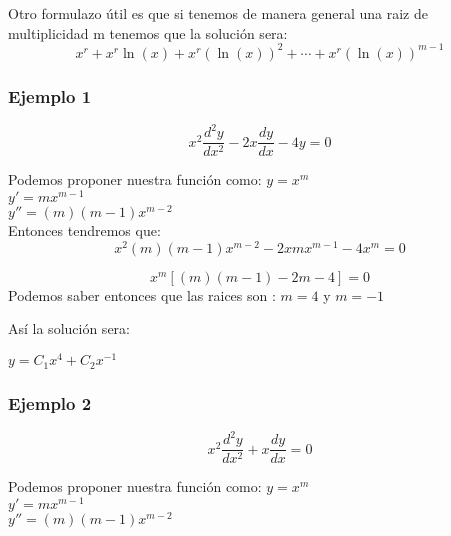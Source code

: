 \documentclass[12pt]{report}                                %
\begin{document}
        Otro formulazo útil es que si tenemos de manera general una raiz de multiplicidad m tenemos que la solución sera:
        \begin{equation}
            x^r + x^r \ln(x) + x^r (\ln(x))^2 + \cdots + x^r (\ln(x))^{m-1}
        \end{equation}


        \clearpage
        \subsubsection{Ejemplo 1}
        \begin{equation*}
            x^2 \frac{d^2 y}{dx^2} - 2x \frac{dy}{dx} - 4y = 0
        \end{equation*}

        Podemos proponer nuestra función como:
        $y = x^m$\\
        $y' = mx^{m-1}$\\
        $y'' = (m)(m-1)x^{m-2}$\\

        Entonces tendremos que:
        \begin{equation*}
            x^2 (m)(m-1)x^{m-2} - 2x mx^{m-1} - 4x^m = 0
        \end{equation*}

        \begin{equation*}
            x^m [(m)(m-1)-  2m -4] = 0
        \end{equation*}
        Podemos saber entonces que las raices son : $ m = 4$ y $m = -1$

        Así la solución sera:

        $y = C_1x^4 + C_2 x^{-1}$

        \clearpage
        \subsubsection{Ejemplo 2}
        \begin{equation*}
            x^2 \frac{d^2 y}{dx^2} + x \frac{dy}{dx} = 0
        \end{equation*}

        Podemos proponer nuestra función como:
        $y = x^m$\\
        $y' = mx^{m-1}$\\
        $y'' = (m)(m-1)x^{m-2}$\\
\end{document}
